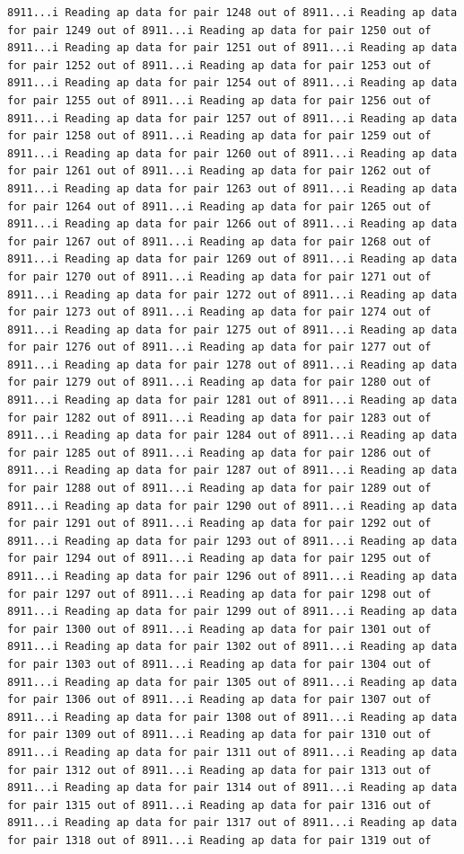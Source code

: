 \documentclass[
]{article}
\begin{document}
\begin{verbatim}
8911...i Reading ap data for pair 1248 out of 8911...i Reading ap data for pair 1249 out of 8911...i Reading ap data for pair 1250 out of 8911...i Reading ap data for pair 1251 out of 8911...i Reading ap data for pair 1252 out of 8911...i Reading ap data for pair 1253 out of 8911...i Reading ap data for pair 1254 out of 8911...i Reading ap data for pair 1255 out of 8911...i Reading ap data for pair 1256 out of 8911...i Reading ap data for pair 1257 out of 8911...i Reading ap data for pair 1258 out of 8911...i Reading ap data for pair 1259 out of 8911...i Reading ap data for pair 1260 out of 8911...i Reading ap data for pair 1261 out of 8911...i Reading ap data for pair 1262 out of 8911...i Reading ap data for pair 1263 out of 8911...i Reading ap data for pair 1264 out of 8911...i Reading ap data for pair 1265 out of 8911...i Reading ap data for pair 1266 out of 8911...i Reading ap data for pair 1267 out of 8911...i Reading ap data for pair 1268 out of 8911...i Reading ap data for pair 1269 out of 8911...i Reading ap data for pair 1270 out of 8911...i Reading ap data for pair 1271 out of 8911...i Reading ap data for pair 1272 out of 8911...i Reading ap data for pair 1273 out of 8911...i Reading ap data for pair 1274 out of 8911...i Reading ap data for pair 1275 out of 8911...i Reading ap data for pair 1276 out of 8911...i Reading ap data for pair 1277 out of 8911...i Reading ap data for pair 1278 out of 8911...i Reading ap data for pair 1279 out of 8911...i Reading ap data for pair 1280 out of 8911...i Reading ap data for pair 1281 out of 8911...i Reading ap data for pair 1282 out of 8911...i Reading ap data for pair 1283 out of 8911...i Reading ap data for pair 1284 out of 8911...i Reading ap data for pair 1285 out of 8911...i Reading ap data for pair 1286 out of 8911...i Reading ap data for pair 1287 out of 8911...i Reading ap data for pair 1288 out of 8911...i Reading ap data for pair 1289 out of 8911...i Reading ap data for pair 1290 out of 8911...i Reading ap data for pair 1291 out of 8911...i Reading ap data for pair 1292 out of 8911...i Reading ap data for pair 1293 out of 8911...i Reading ap data for pair 1294 out of 8911...i Reading ap data for pair 1295 out of 8911...i Reading ap data for pair 1296 out of 8911...i Reading ap data for pair 1297 out of 8911...i Reading ap data for pair 1298 out of 8911...i Reading ap data for pair 1299 out of 8911...i Reading ap data for pair 1300 out of 8911...i Reading ap data for pair 1301 out of 8911...i Reading ap data for pair 1302 out of 8911...i Reading ap data for pair 1303 out of 8911...i Reading ap data for pair 1304 out of 8911...i Reading ap data for pair 1305 out of 8911...i Reading ap data for pair 1306 out of 8911...i Reading ap data for pair 1307 out of 8911...i Reading ap data for pair 1308 out of 8911...i Reading ap data for pair 1309 out of 8911...i Reading ap data for pair 1310 out of 8911...i Reading ap data for pair 1311 out of 8911...i Reading ap data for pair 1312 out of 8911...i Reading ap data for pair 1313 out of 8911...i Reading ap data for pair 1314 out of 8911...i Reading ap data for pair 1315 out of 8911...i Reading ap data for pair 1316 out of 8911...i Reading ap data for pair 1317 out of 8911...i Reading ap data for pair 1318 out of 8911...i Reading ap data for pair 1319 out of 
\end{verbatim}
\end{document}
